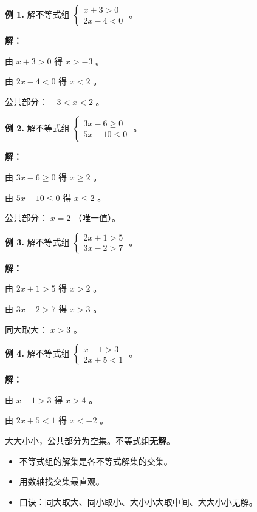 \begin{workedexamples}


\textbf{例 1.} 解不等式组 $\begin{cases} x + 3 > 0 \\ 2x - 4 < 0 \end{cases}$ 。

\textbf{解：}

由 $x + 3 > 0$ 得 $x > -3$ 。

由 $2x - 4 < 0$ 得 $x < 2$ 。

公共部分： $-3 < x < 2$ 。

\textbf{例 2.} 解不等式组 $\begin{cases} 3x - 6 \geq 0 \\ 5x - 10 \leq 0 \end{cases}$ 。

\textbf{解：}

由 $3x - 6 \geq 0$ 得 $x \geq 2$ 。

由 $5x - 10 \leq 0$ 得 $x \leq 2$ 。

公共部分： $x = 2$ （唯一值）。

\textbf{例 3.} 解不等式组 $\begin{cases} 2x + 1 > 5 \\ 3x - 2 > 7 \end{cases}$ 。

\textbf{解：}

由 $2x + 1 > 5$ 得 $x > 2$ 。

由 $3x - 2 > 7$ 得 $x > 3$ 。

同大取大： $x > 3$ 。

\textbf{例 4.} 解不等式组 $\begin{cases} x - 1 > 3 \\ 2x + 5 < 1 \end{cases}$ 。

\textbf{解：}

由 $x - 1 > 3$ 得 $x > 4$ 。

由 $2x + 5 < 1$ 得 $x < -2$ 。

大大小小，公共部分为空集。不等式组\textbf{无解}。

\end{workedexamples}

\begin{keytakeaway}


\begin{itemize}
  \item 不等式组的解集是各不等式解集的交集。
  \item 用数轴找交集最直观。
  \item 口诀：同大取大、同小取小、大小小大取中间、大大小小无解。
\end{itemize}


\end{keytakeaway}

